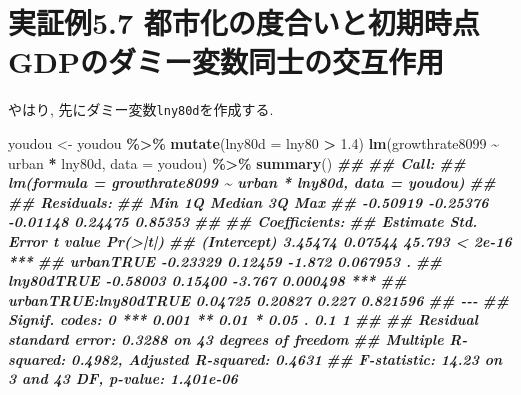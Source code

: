 \documentclass[
]{book}
\newenvironment{Shaded}{\begin{snugshade}}{\end{snugshade}}
\newcommand{\AttributeTok}[1]{\textcolor[rgb]{0.13,0.29,0.53}{#1}}
\newcommand{\DocumentationTok}[1]{\textcolor[rgb]{0.56,0.35,0.01}{\textbf{\textit{#1}}}}
\newcommand{\FloatTok}[1]{\textcolor[rgb]{0.00,0.00,0.81}{#1}}
\newcommand{\FunctionTok}[1]{\textcolor[rgb]{0.13,0.29,0.53}{\textbf{#1}}}
\newcommand{\NormalTok}[1]{#1}
\newcommand{\OtherTok}[1]{\textcolor[rgb]{0.56,0.35,0.01}{#1}}
\newcommand{\SpecialCharTok}[1]{\textcolor[rgb]{0.81,0.36,0.00}{\textbf{#1}}}
\begin{document}
\hypertarget{ux5b9fux8a3cux4f8b5.7-ux90fdux5e02ux5316ux306eux5ea6ux5408ux3044ux3068ux521dux671fux6642ux70b9gdpux306eux30c0ux30dfux30fcux5909ux6570ux540cux58ebux306eux4ea4ux4e92ux4f5cux7528}{%
\section*{実証例5.7 都市化の度合いと初期時点GDPのダミー変数同士の交互作用}\label{ux5b9fux8a3cux4f8b5.7-ux90fdux5e02ux5316ux306eux5ea6ux5408ux3044ux3068ux521dux671fux6642ux70b9gdpux306eux30c0ux30dfux30fcux5909ux6570ux540cux58ebux306eux4ea4ux4e92ux4f5cux7528}}

やはり, 先にダミー変数\texttt{lny80d}を作成する.

\begin{Shaded}
\begin{Highlighting}[]
\NormalTok{youdou }\OtherTok{\textless{}{-}}\NormalTok{ youdou }\SpecialCharTok{\%\textgreater{}\%}
    \FunctionTok{mutate}\NormalTok{(}\AttributeTok{lny80d =}\NormalTok{ lny80 }\SpecialCharTok{\textgreater{}} \FloatTok{1.4}\NormalTok{)}
\FunctionTok{lm}\NormalTok{(growthrate8099 }\SpecialCharTok{\textasciitilde{}}\NormalTok{ urban }\SpecialCharTok{*}\NormalTok{ lny80d, }\AttributeTok{data =}\NormalTok{ youdou) }\SpecialCharTok{\%\textgreater{}\%} \FunctionTok{summary}\NormalTok{()}
\DocumentationTok{\#\# }
\DocumentationTok{\#\# Call:}
\DocumentationTok{\#\# lm(formula = growthrate8099 \textasciitilde{} urban * lny80d, data = youdou)}
\DocumentationTok{\#\# }
\DocumentationTok{\#\# Residuals:}
\DocumentationTok{\#\#      Min       1Q   Median       3Q      Max }
\DocumentationTok{\#\# {-}0.50919 {-}0.25376 {-}0.01148  0.24475  0.85353 }
\DocumentationTok{\#\# }
\DocumentationTok{\#\# Coefficients:}
\DocumentationTok{\#\#                      Estimate Std. Error t value Pr(\textgreater{}|t|)    }
\DocumentationTok{\#\# (Intercept)           3.45474    0.07544  45.793  \textless{} 2e{-}16 ***}
\DocumentationTok{\#\# urbanTRUE            {-}0.23329    0.12459  {-}1.872 0.067953 .  }
\DocumentationTok{\#\# lny80dTRUE           {-}0.58003    0.15400  {-}3.767 0.000498 ***}
\DocumentationTok{\#\# urbanTRUE:lny80dTRUE  0.04725    0.20827   0.227 0.821596    }
\DocumentationTok{\#\# {-}{-}{-}}
\DocumentationTok{\#\# Signif. codes:  0 \textquotesingle{}***\textquotesingle{} 0.001 \textquotesingle{}**\textquotesingle{} 0.01 \textquotesingle{}*\textquotesingle{} 0.05 \textquotesingle{}.\textquotesingle{} 0.1 \textquotesingle{} \textquotesingle{} 1}
\DocumentationTok{\#\# }
\DocumentationTok{\#\# Residual standard error: 0.3288 on 43 degrees of freedom}
\DocumentationTok{\#\# Multiple R{-}squared:  0.4982, Adjusted R{-}squared:  0.4631 }
\DocumentationTok{\#\# F{-}statistic: 14.23 on 3 and 43 DF,  p{-}value: 1.401e{-}06}
\end{Highlighting}
\end{Shaded}
\end{document}
